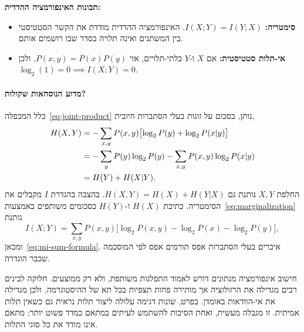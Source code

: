 \textbf{תכונות האינפורמציה ההדדית:}
\begin{itemize}
\item \textbf{סימטריה:} $I(X; Y) = I(Y; X)$. האינפורמציה ההדדית מודדת את הקשר הסטטיסטי בין המשתנים ואינה תלויה בסדר שבו רושמים אותם.
\item \textbf{אי-תלות סטטיסטית:} אם $X$ ו-$Y$ בלתי-תלויים, אזי $P(x, y) = P(x)P(y)$, ולכן $\log_2(1) = 0 \implies I(X; Y) = 0$.
\end{itemize}

\paragraph{מדוע הנוסחאות שקולות?}
כלל המכפלה~\eqref{eq:joint-product} נותן, בסכום על זוגות בעלי הסתברות חיובית,
\begin{align}
H(X,Y)&=-\sum_{x,y}P(x,y)\bigl[\log_2P(y)+\log_2P(x|y)\bigr]\notag\\
&=-\sum_yP(y)\log_2P(y)-\sum_{x,y}P(x,y)\log_2P(x|y)\notag\\
&=H(Y)+H(X|Y).\label{eq:entropy-chain-rule}
\end{align}
החלפת $X,Y$ נותנת גם $H(X,Y)=H(X)+H(Y|X)$. בהצבה בהגדרת $I$ מקבלים את הסימטריה. כתיבת $H(X)$ ו-$H(Y)$ כסכומים משותפים באמצעות~\eqref{eq:marginalization} נותנת
\begin{equation}\label{eq:mi-log-ratio-derivation}
I(X;Y)=\sum_{x,y}P(x,y)\bigl[\log_2P(x,y)-\log_2P(x)-\log_2P(y)\bigr],
\end{equation}
ומכאן~\eqref{eq:mi-sum-formula}. איברים בעלי הסתברות אפס תורמים אפס לפי המוסכמה שכבר הוגדרה.

\begin{remark}
חישוב אינפורמציה מנתונים דורש לאמוד התפלגות משותפת, ולא רק ממוצעים. חלוקה לבינים רבים מגדילה את הרזולוציה אך מותירה פחות תצפיות בכל תא של ההיסטוגרמה, ולכן מגדילה את אי-הוודאות באומדן. בפרט, שונות דגימה עלולה ליצור תלות נראית גם כשאין תלות אמיתית. זו מגבלה מעשית, ואחת הסיבות להשתמש לעיתים במתאם כמדד פשוט יותר; מתאם אינו מודד את כל סוגי התלות.
\end{remark}


